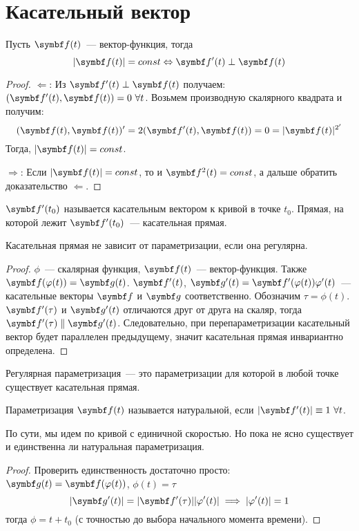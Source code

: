 \documentclass[main]{subfiles}
\begin{document}
\chapter{Касательный вектор}
\begin{lemma}\label{dfoc:very_important_lemma}
    Пусть $\vf(t)$~--- вектор-функция, тогда
    \[|\vf(t)| = const \Leftrightarrow \vf'(t) \perp \vf(t)\]
\end{lemma}
\begin{proof}
    $\Longleftarrow$: Из $\vf'(t) \perp \vf(t)$ получаем: $ (\vf'(t), \vf(t)) = 0\ \forall t$.
    Возьмем производную скалярного квадрата и получим:
    \[(\vf(t), \vf(t))' = 2(\vf'(t), \vf(t)) = 0 = |\vf(t)|^{2'}\]
    Тогда, $|\vf(t)| = const$.

    $\Longrightarrow$: Если $|\vf(t)| = const$, то и $\vf^2(t) = const$, а дальше обратить доказательство $\Longleftarrow$.
\end{proof}
\begin{definition}
    $\vf'(t_0)$ называется касательным вектором к кривой в точке $t_0$.
    Прямая, на которой лежит $\vf'(t_0)$~--- касательная прямая.
\end{definition}
\begin{theorem}
    Касательная прямая не зависит от параметризации, если она регулярна.
\end{theorem}
\begin{proof}
    $\phi$~--- скалярная функция, $\vf(t)$~--- вектор-функ\-ция.
    Также $\vf(\phi(t)) = \vg(t)$.
    $\vf'(t)$, $\vg'(t) = \vf'(\phi(t)) \phi'(t)$~--- касательные векторы $\vf$ и $\vg$ соответственно.
    Обозначим $\tau = \phi(t)$.
    $\vf'(\tau)$ и $\vg'(t)$ отличаются друг от друга на скаляр,
    тогда $\vf'(\tau) \parallel \vg'(t)$.
    Следовательно, при перепараметризации касательный вектор будет параллелен предыдущему, значит касательная прямая инвариантно определена.
\end{proof}
\begin{remark}
    Регулярная параметризация~--- это параметризации для которой в любой точке существует касательная прямая.
\end{remark}
\begin{definition}
    Параметризация $\vf(t)$ называется натуральной, если $|\vf'(t)| \equiv 1\ \forall t$.
\end{definition}
По сути, мы идем по кривой с единичной скоростью.
Но пока не ясно существует и единственна ли натуральная параметризация.
\begin{proof}
    Проверить единственность достаточно просто: $\vg(t) = \vf(\phi(t))$, $\phi(t) = \tau$
    \[|\vg'(t)| = |\vf'(\tau)| |\phi'(t)| \implies |\phi'(t)| = 1\]
    тогда $\phi = t + t_0$ (с точностью до выбора начального момента времени).
\end{proof}
\end{document}
